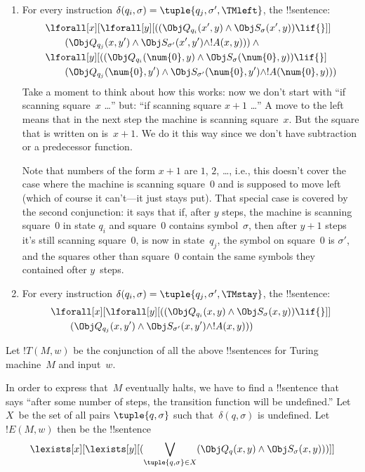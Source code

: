 \documentclass[../../../include/open-logic-section]{subfiles}
\begin{document}
\begin{enumerate}
\begin{enumerate}
\item {} For every instruction $\delta(q_i, \sigma) =
  \tuple{q_j, \sigma', \TMleft}$, the !!{sentence}:
\begin{align*}
& \lforall[x][\lforall[y][
    ((\Obj Q_{q_i}(x', y) \land \Obj S_{\sigma}(x', y)) \lif {}]]\\
& \qquad   (\Obj Q_{q_j}(x, y') \land \Obj S_{\sigma'}(x', y') \land
!A(x, y))) \land {}\\
& \lforall[y][((\Obj Q_{q_i}(\num{0}, y) \land \Obj S_{\sigma}(\num{0},
    y)) \lif {}]\\
& \qquad (\Obj Q_{q_j}(\num{0}, y') \land \Obj S_{\sigma'}(\num{0},
  y') \land !A(\num{0}, y)))
\end{align*}
Take a moment to think about how this works: now we don't start with
``if scanning square~$x$ \dots'' but: ``if scanning square $x+1$
\dots'' A move to the left means that in the next step the machine is
scanning square~$x$.  But the square that is written on is~$x+1$.  We
do it this way since we don't have subtraction or a predecessor
function.

Note that numbers of the form $x+1$ are $1$, $2$, \dots, i.e., this
doesn't cover the case where the machine is scanning square~$0$ and is
supposed to move left (which of course it can't---it just stays
put). That special case is covered by the second conjunction: it says
that if, after $y$ steps, the machine is scanning square~$0$ in state
$q_i$ and square~$0$ contains symbol~$\sigma$, then after $y+1$ steps
it's still scanning square~$0$, is now in state~$q_j$, the symbol on
square~$0$ is $\sigma'$, and the squares other than square~$0$ contain
the same symbols they contained ofter $y$~steps.
\item {} For every instruction $\delta(q_i, \sigma) =
  \tuple{q_j, \sigma', \TMstay}$, the !!{sentence}:
\begin{align*}
& \lforall[x][\lforall[y][(
   (\Obj Q_{q_i}(x, y) \land \Obj S_{\sigma}(x, y)) \lif {}]] \\
&\qquad   (\Obj Q_{q_j}(x, y') \land \Obj S_{\sigma'}(x, y') \land
!A(x, y)))
\end{align*}
\end{enumerate}
\end{enumerate}
Let $!T(M, w)$ be the conjunction of all the above !!{sentence}s for Turing
machine~$M$ and input~$w$.

In order to express that~$M$ eventually halts, we have to find a
!!{sentence} that says ``after some number of steps, the transition
function will be undefined.''  Let $X$~be the set of all pairs
$\tuple{q, \sigma}$ such that~$\delta(q, \sigma)$ is undefined.  Let
$!E(M, w)$ then be the !!{sentence}
\[
\lexists[x][\lexists[y][(\bigvee_{\tuple{q, \sigma} \in
      X}(\Obj Q_q(x, y) \land \Obj S_\sigma(x, y)))]]
\]
\end{document}
